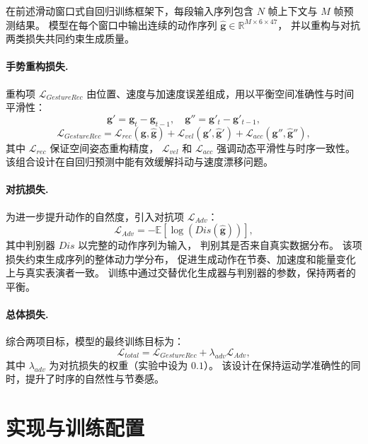 在前述滑动窗口式自回归训练框架下，每段输入序列包含 $N$ 帧上下文与 $M$ 帧预测结果。
模型在每个窗口中输出连续的动作序列 $\hat{\bm{g}} \in \mathbb{R}^{M \times 6 \times 47}$，
并以重构与对抗两类损失共同约束生成质量。

\paragraph{手势重构损失.}
重构项 $\mathcal{L}_{Gesture Rec}$ 由位置、速度与加速度误差组成，用以平衡空间准确性与时间平滑性：
\begin{equation}
\bm{g}' = \bm{g}_t - \bm{g}_{t-1}, \quad \bm{g}'' = \bm{g}'_t - \bm{g}'_{t-1},
\end{equation}
\begin{equation}
\mathcal{L}_{Gesture Rec} = \mathcal{L}_{rec}(\bm{g}, \hat{\bm{g}}) + \mathcal{L}_{vel}(\bm{g}', \hat{\bm{g}}') + \mathcal{L}_{acc}(\bm{g}'', \hat{\bm{g}}''),
\end{equation}
其中 $\mathcal{L}_{rec}$ 保证空间姿态重构精度，
$\mathcal{L}_{vel}$ 和 $\mathcal{L}_{acc}$ 强调动态平滑性与时序一致性。
该组合设计在自回归预测中能有效缓解抖动与速度漂移问题。

\paragraph{对抗损失.}
为进一步提升动作的自然度，引入对抗项 $\mathcal{L}_{Adv}$：
\begin{equation}
\mathcal{L}_{Adv} = -\mathbb{E}[\log(Dis(\hat{\bm{g}}))],
\end{equation}
其中判别器 $Dis$ 以完整的动作序列为输入，
判别其是否来自真实数据分布。
该项损失约束生成序列的整体动力学分布，
促进生成动作在节奏、加速度和能量变化上与真实表演者一致。
训练中通过交替优化生成器与判别器的参数，保持两者的平衡。

\paragraph{总体损失.}
综合两项目标，模型的最终训练目标为：
\begin{equation}
\mathcal{L}_{total} = \mathcal{L}_{Gesture Rec} + \lambda_{adv}\mathcal{L}_{Adv},
\end{equation}
其中 $\lambda_{adv}$ 为对抗损失的权重（实验中设为 $0.1$）。
该设计在保持运动学准确性的同时，提升了时序的自然性与节奏感。

\section{实现与训练配置}

